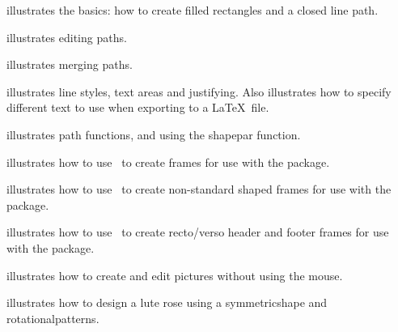 \begin{deflist}
\begin{itemdesc}
 illustrates the basics:
how to create filled rectangles and a closed line \gls{path}.
\end{itemdesc}

\begin{itemdesc}
 illustrates editing paths.
\end{itemdesc}

\begin{itemdesc}
 illustrates merging paths.
\end{itemdesc}

\begin{itemdesc}
 illustrates
line styles, text areas and justifying. Also illustrates
how to specify different text to use when exporting to a
\LaTeX\ file.
\end{itemdesc}

\begin{itemdesc}
 illustrates
path functions, and using the shapepar function.
\end{itemdesc}

\begin{itemdesc}
 illustrates how to
use \FlowframTk\ to create frames for use with the 
package.
\end{itemdesc}

\begin{itemdesc}
 illustrates how to
use \FlowframTk\ to create non-standard shaped frames for use with the
 package.
\end{itemdesc}

\begin{itemdesc}
 illustrates how to use \FlowframTk\
to create \gls{recto}\slash\gls{verso} header and footer frames for
use with the \sty{flowfram} package.
\end{itemdesc}

\begin{itemdesc}
 illustrates how to create and 
edit pictures without using the mouse.
\end{itemdesc}

\begin{itemdesc}
 illustrates how to design a lute rose
using a \gls{symmetricshape} and \glspl{rotationalpattern}.
\end{itemdesc}

\end{deflist}


